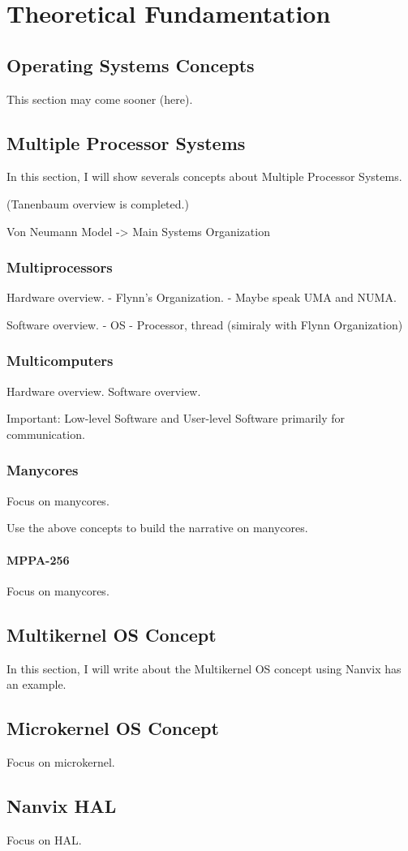 \chapter{Theoretical Fundamentation} %
\label{ch.fundamentation}

\section{Operating Systems Concepts}
    This section may come sooner (here).

\section{Multiple Processor Systems}

    In this section, I will show severals concepts about Multiple Processor Systems.
    
    (Tanenbaum overview is completed.)

    Von Neumann Model -> Main Systems Organization

\subsection{Multiprocessors}
    Hardware overview.
    - Flynn's Organization.
    - Maybe speak UMA and NUMA.
    
    Software overview.
    - OS
    - Processor, thread (simiraly with Flynn Organization)


\subsection{Multicomputers}
    Hardware overview.
    Software overview.

    Important: Low-level Software and User-level Software primarily for communication.

\subsection{Manycores}
    Focus on manycores.

    Use the above concepts to build the narrative on manycores.

\subsubsection{MPPA-256}
    Focus on manycores.

\section{Multikernel OS Concept}
    In this section, I will write about the Multikernel OS concept using Nanvix has an example.

\section{Microkernel OS Concept}
    Focus on microkernel.

\section{Nanvix HAL}
    Focus on HAL.